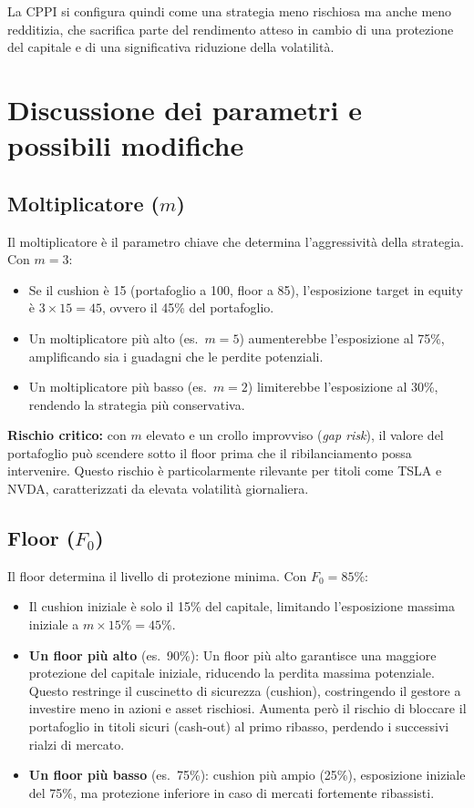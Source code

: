 \documentclass[11pt, a4paper]{report} %
\begin{document}
La CPPI si configura quindi come una strategia meno rischiosa ma anche meno redditizia, che sacrifica parte del rendimento atteso in cambio di una protezione del capitale e di una significativa riduzione della volatilità.

\section{Discussione dei parametri e possibili modifiche}

\subsection{Moltiplicatore ($m$)}

Il moltiplicatore è il parametro chiave che determina l'aggressività della strategia.  Con $m = 3$:
\begin{itemize}
    \item Se il cushion è 15 (portafoglio a 100, floor a 85), l'esposizione target in equity è $3 \times 15 = 45$, ovvero il 45\% del portafoglio.
    \item Un moltiplicatore più alto (es.\ $m = 5$) aumenterebbe l'esposizione al 75\%, amplificando sia i guadagni che le perdite potenziali.
    \item Un moltiplicatore più basso (es.\ $m = 2$) limiterebbe l'esposizione al 30\%, rendendo la strategia più conservativa.
\end{itemize}

\textbf{Rischio critico:} con $m$ elevato e un crollo improvviso (\textit{gap risk}), il valore del portafoglio può scendere sotto il floor prima che il ribilanciamento possa intervenire.  Questo rischio è particolarmente rilevante per titoli come TSLA e NVDA, caratterizzati da elevata volatilità giornaliera.

\subsection{Floor ($F_0$)}

Il floor determina il livello di protezione minima.  Con $F_0 = 85\%$:
\begin{itemize}
    \item Il cushion iniziale è solo il 15\% del capitale, limitando l'esposizione massima iniziale a $m \times 15\% = 45\%$.
    \item \textbf{Un floor più alto} (es.\ 90\%): Un floor più alto garantisce una maggiore protezione del capitale iniziale, riducendo la perdita massima potenziale. Questo restringe il cuscinetto di sicurezza (cushion), costringendo il gestore a investire meno in azioni e asset rischiosi. Aumenta però il rischio di bloccare il portafoglio in titoli sicuri (cash-out) al primo ribasso, perdendo i successivi rialzi di mercato.
    \item \textbf{Un floor più basso} (es.\ 75\%): cushion più ampio (25\%), esposizione iniziale del 75\%, ma protezione inferiore in caso di mercati fortemente ribassisti.
\end{itemize}
\end{document}
